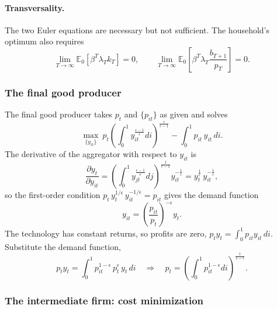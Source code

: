 \documentclass[11pt]{article}
\begin{document}
\paragraph{Transversality.} The two Euler equations are necessary but not sufficient. The household's optimum also requires
\begin{equation*}
\lim_{T \to \infty} \mathbb{E}_0 \left[ \beta^T \lambda_T k_T \right] = 0, \qquad
\lim_{T \to \infty} \mathbb{E}_0 \left[ \beta^T \lambda_T \frac{b_{T+1}}{p_T} \right] = 0 .
\end{equation*}

\subsubsection{The final good producer}

The final good producer takes $p_t$ and $\{p_{it}\}$ as given and solves
\begin{equation*}
\max_{\{y_{it}\}} \ p_t \left( \int_0^1 y_{it}^{\frac{\epsilon-1}{\epsilon}} di \right)^{\frac{\epsilon}{\epsilon-1}} - \int_0^1 p_{it}\, y_{it}\, di .
\end{equation*}
The derivative of the aggregator with respect to $y_{it}$ is
\begin{equation*}
\frac{\partial y_t}{\partial y_{it}} = \left( \int_0^1 y_{jt}^{\frac{\epsilon-1}{\epsilon}} dj \right)^{\frac{1}{\epsilon-1}} y_{it}^{-\frac{1}{\epsilon}} = y_t^{\frac{1}{\epsilon}}\, y_{it}^{-\frac{1}{\epsilon}},
\end{equation*}
so the first-order condition $p_t\, y_t^{1/\epsilon}\, y_{it}^{-1/\epsilon} = p_{it}$ gives the demand function
\begin{equation*}
y_{it} = \left( \frac{p_{it}}{p_t} \right)^{-\epsilon} y_t .
\end{equation*}
The technology has constant returns, so profits are zero, $p_t y_t = \int_0^1 p_{it} y_{it}\, di$. Substitute the demand function,
\begin{equation*}
p_t y_t = \int_0^1 p_{it}^{1-\epsilon}\, p_t^{\epsilon}\, y_t\, di
\quad \Longrightarrow \quad
p_t = \left( \int_0^1 p_{it}^{1-\epsilon} di \right)^{\frac{1}{1-\epsilon}} .
\end{equation*}

\subsubsection{The intermediate firm: cost minimization}
\end{document}

